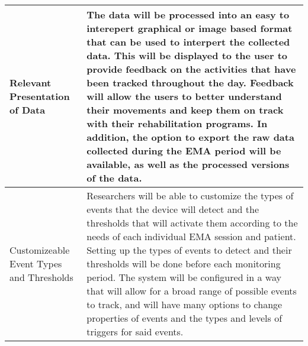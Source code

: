 \documentclass[12pt]{article}
\begin{document}
\begin{center}
\begin{tabular}{ | m{7em} | m{32em}| }
        \hline
        Relevant \linebreak Presentation of Data                   & The data will be processed into an easy to interepert graphical or image based format that can be used to interpert the collected data. This will be displayed to the user to provide feedback on the activities that have been tracked throughout the day. Feedback will allow the users to better understand their movements and keep them on track with their rehabilitation programs. In addition, the option to export the raw data collected during the EMA period will be available, as well as the processed versions of the data.                                                                                                                                                                                      \\
	\hline
	Customizeable Event Types and Thresholds			& Researchers will be able to customize the types of events that the device will detect and the thresholds that will activate them according to the needs of each individual EMA session and patient. Setting up the types of events to detect and their thresholds will be done before each monitoring period. The system will be configured in a way that will allow for a broad range of possible events to track, and will have many options to change properties of events and the types and levels of triggers for said events.
\\
        \hline
    \end{tabular}
\end{center}

\pagebreak
\end{document}
